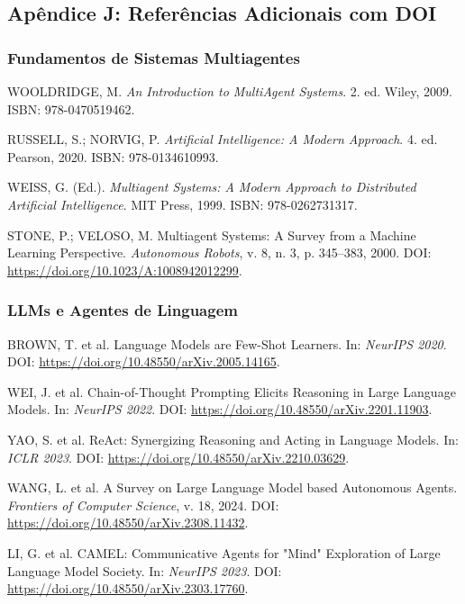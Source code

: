 \subsection{Apêndice J: Referências Adicionais com DOI}
\label{sec:apendice-refs-extra}

\subsubsection{Fundamentos de Sistemas Multiagentes}

\begin{enumerate}[leftmargin=*, label={[R\arabic*]}, resume]
  \item WOOLDRIDGE, M. \textit{An Introduction to MultiAgent Systems}. 2. ed. Wiley, 2009. ISBN: 978-0470519462.
  
  \item RUSSELL, S.; NORVIG, P. \textit{Artificial Intelligence: A Modern Approach}. 4. ed. Pearson, 2020. ISBN: 978-0134610993.
  
  \item WEISS, G. (Ed.). \textit{Multiagent Systems: A Modern Approach to Distributed Artificial Intelligence}. MIT Press, 1999. ISBN: 978-0262731317.
  
  \item STONE, P.; VELOSO, M. Multiagent Systems: A Survey from a Machine Learning Perspective. \textit{Autonomous Robots}, v. 8, n. 3, p. 345--383, 2000. DOI: \url{https://doi.org/10.1023/A:1008942012299}.
\end{enumerate}

\subsubsection{LLMs e Agentes de Linguagem}

\begin{enumerate}[leftmargin=*, label={[R\arabic*]}, resume]
  \item BROWN, T. et al. Language Models are Few-Shot Learners. In: \textit{NeurIPS 2020}. DOI: \url{https://doi.org/10.48550/arXiv.2005.14165}.
  
  \item WEI, J. et al. Chain-of-Thought Prompting Elicits Reasoning in Large Language Models. In: \textit{NeurIPS 2022}. DOI: \url{https://doi.org/10.48550/arXiv.2201.11903}.
  
  \item YAO, S. et al. ReAct: Synergizing Reasoning and Acting in Language Models. In: \textit{ICLR 2023}. DOI: \url{https://doi.org/10.48550/arXiv.2210.03629}.
  
  \item WANG, L. et al. A Survey on Large Language Model based Autonomous Agents. \textit{Frontiers of Computer Science}, v. 18, 2024. DOI: \url{https://doi.org/10.48550/arXiv.2308.11432}.
  
  \item LI, G. et al. CAMEL: Communicative Agents for "Mind" Exploration of Large Language Model Society. In: \textit{NeurIPS 2023}. DOI: \url{https://doi.org/10.48550/arXiv.2303.17760}.
\end{enumerate}

